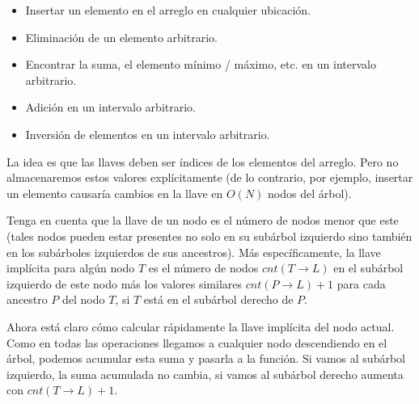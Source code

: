 \documentclass[12pt]{article}
\newcommand{\nl}{\vspace{0.3cm}}
\begin{document}
\begin{itemize}
	\item Insertar un elemento en el arreglo en cualquier ubicación.
	\item Eliminación de un elemento arbitrario.
	\item Encontrar la suma, el elemento mínimo / máximo, etc. en un intervalo arbitrario.
	\item Adición en un intervalo arbitrario.
	\item Inversión de elementos en un intervalo arbitrario.
\end{itemize}

La idea es que las llaves deben ser índices de los elementos del arreglo. Pero no almacenaremos estos valores explícitamente (de lo contrario, por ejemplo, insertar un elemento causaría cambios en la llave en $O(N)$ nodos del árbol).

\nl

Tenga en cuenta que la llave de un nodo es el número de nodos menor que este (tales nodos pueden estar presentes no solo en su subárbol izquierdo sino también en los subárboles izquierdos de sus ancestros). Más específicamente, la llave implícita para algún nodo $T$ es el número de nodos $cnt(T \rightarrow L)$ en el subárbol izquierdo de este nodo más los valores similares $cnt(P \rightarrow L) + 1$ para cada ancestro $P$ del nodo $T$, si $T$ está en el subárbol derecho de $P$.

\nl

Ahora está claro cómo calcular rápidamente la llave implícita del nodo actual. Como en todas las operaciones llegamos a cualquier nodo descendiendo en el árbol, podemos acumular esta suma y pasarla a la función. Si vamos al subárbol izquierdo, la suma acumulada no cambia, si vamos al subárbol derecho aumenta con $cnt(T \rightarrow L) + 1$.
\end{document}

